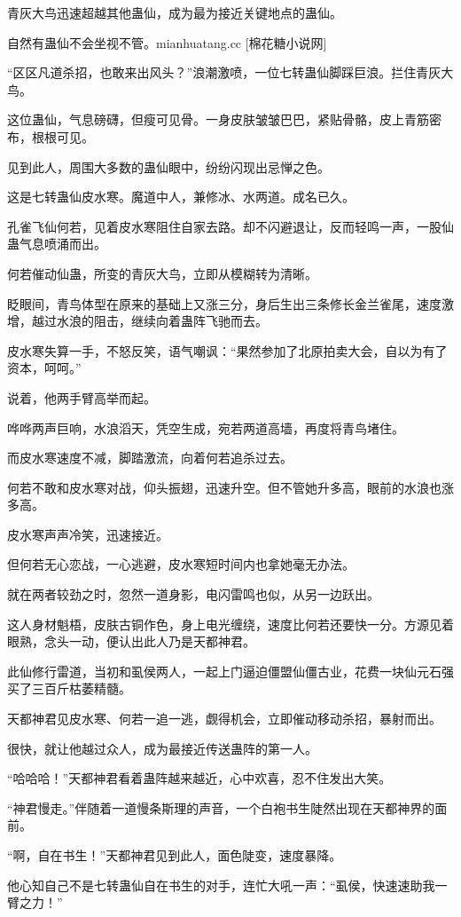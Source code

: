 \begin{this_body}
青灰大鸟迅速超越其他蛊仙，成为最为接近关键地点的蛊仙。

自然有蛊仙不会坐视不管。mianhuatang.cc [棉花糖小说网]

“区区凡道杀招，也敢来出风头？”浪潮激喷，一位七转蛊仙脚踩巨浪。拦住青灰大鸟。

这位蛊仙，气息磅礴，但瘦可见骨。一身皮肤皱皱巴巴，紧贴骨骼，皮上青筋密布，根根可见。

见到此人，周围大多数的蛊仙眼中，纷纷闪现出忌惮之色。

这是七转蛊仙皮水寒。魔道中人，兼修冰、水两道。成名已久。

孔雀飞仙何若，见着皮水寒阻住自家去路。却不闪避退让，反而轻鸣一声，一股仙蛊气息喷涌而出。

何若催动仙蛊，所变的青灰大鸟，立即从模糊转为清晰。

眨眼间，青鸟体型在原来的基础上又涨三分，身后生出三条修长金兰雀尾，速度激增，越过水浪的阻击，继续向着蛊阵飞驰而去。

皮水寒失算一手，不怒反笑，语气嘲讽：“果然参加了北原拍卖大会，自以为有了资本，呵呵。”

说着，他两手臂高举而起。

哗哗两声巨响，水浪滔天，凭空生成，宛若两道高墙，再度将青鸟堵住。

而皮水寒速度不减，脚踏激流，向着何若追杀过去。

何若不敢和皮水寒对战，仰头振翅，迅速升空。但不管她升多高，眼前的水浪也涨多高。

皮水寒声声冷笑，迅速接近。

但何若无心恋战，一心逃避，皮水寒短时间内也拿她毫无办法。

就在两者较劲之时，忽然一道身影，电闪雷鸣也似，从另一边跃出。

这人身材魁梧，皮肤古铜作色，身上电光缠绕，速度比何若还要快一分。方源见着眼熟，念头一动，便认出此人乃是天都神君。

此仙修行雷道，当初和虱侯两人，一起上门逼迫僵盟仙僵古业，花费一块仙元石强买了三百斤枯萎精髓。

天都神君见皮水寒、何若一追一逃，觑得机会，立即催动移动杀招，暴射而出。

很快，就让他越过众人，成为最接近传送蛊阵的第一人。

“哈哈哈！”天都神君看着蛊阵越来越近，心中欢喜，忍不住发出大笑。

“神君慢走。”伴随着一道慢条斯理的声音，一个白袍书生陡然出现在天都神界的面前。

“啊，自在书生！”天都神君见到此人，面色陡变，速度暴降。

他心知自己不是七转蛊仙自在书生的对手，连忙大吼一声：“虱侯，快速速助我一臂之力！”


\end{this_body}
